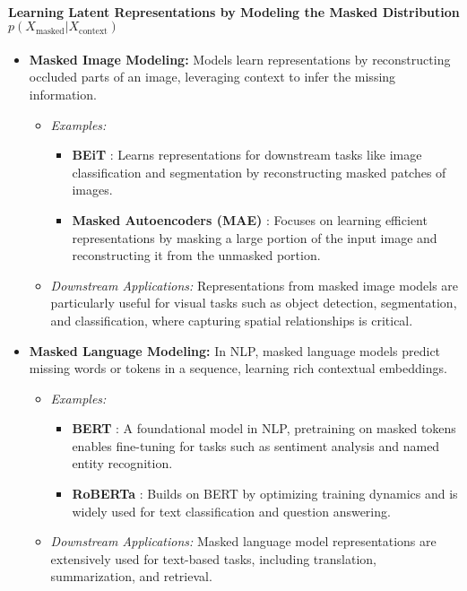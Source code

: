\paragraph{Learning Latent Representations by Modeling the Masked Distribution $p(X_{\text{masked}}|X_{\text{context}})$}

\begin{itemize}
    \item \textbf{Masked Image Modeling:}
    Models learn representations by reconstructing occluded parts of an image, leveraging context to infer the missing information.
    \begin{itemize}
        \item \emph{Examples:}
        \begin{itemize}
            \item \textbf{BEiT} \citep{bao2021beit}: Learns representations for downstream tasks like image classification and segmentation by reconstructing masked patches of images.
            \item \textbf{Masked Autoencoders (MAE)} \citep{he2022masked}: Focuses on learning efficient representations by masking a large portion of the input image and reconstructing it from the unmasked portion.
        \end{itemize}
        \item \emph{Downstream Applications:}
        Representations from masked image models are particularly useful for visual tasks such as object detection, segmentation, and classification, where capturing spatial relationships is critical.
    \end{itemize}

    \item \textbf{Masked Language Modeling:}
    In NLP, masked language models predict missing words or tokens in a sequence, learning rich contextual embeddings.
    \begin{itemize}
        \item \emph{Examples:}
        \begin{itemize}
            \item \textbf{BERT} \citep{devlin2019bert}: A foundational model in NLP, pretraining on masked tokens enables fine-tuning for tasks such as sentiment analysis and named entity recognition.
            \item \textbf{RoBERTa} \citep{liu2019roberta}: Builds on BERT by optimizing training dynamics and is widely used for text classification and question answering.
        \end{itemize}
        \item \emph{Downstream Applications:}
        Masked language model representations are extensively used for text-based tasks, including translation, summarization, and retrieval.
    \end{itemize}
\end{itemize}

